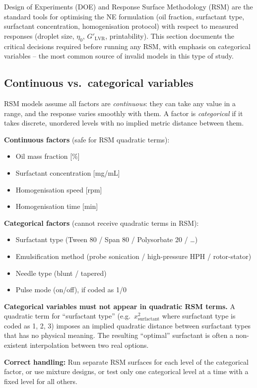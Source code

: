 \documentclass[11pt,a4paper]{article}
\begin{document}
Design of Experiments (DOE) and Response Surface Methodology (RSM)
are the standard tools for optimising the NE formulation (oil fraction,
surfactant type, surfactant concentration, homogenisation protocol)
with respect to measured responses (droplet size, $\eta_0$, $G'_\mathrm{LVR}$,
printability). This section documents the critical decisions required
before running any RSM, with emphasis on categorical variables -- the
most common source of invalid models in this type of study.

\subsection{Continuous vs.\ categorical variables}

RSM models assume all factors are \emph{continuous}: they can take any
value in a range, and the response varies smoothly with them. A factor
is \emph{categorical} if it takes discrete, unordered levels with no
implied metric distance between them.

\textbf{Continuous factors} (safe for RSM quadratic terms):
\begin{itemize}[leftmargin=1.4em,itemsep=1pt]
\item Oil mass fraction [\%]
\item Surfactant concentration [mg/mL]
\item Homogenisation speed [rpm]
\item Homogenisation time [min]
\end{itemize}

\textbf{Categorical factors} (cannot receive quadratic terms in RSM):
\begin{itemize}[leftmargin=1.4em,itemsep=1pt]
\item Surfactant type (Tween 80 / Span 80 / Polysorbate 20 / \ldots)
\item Emulsification method (probe sonication / high-pressure HPH /
  rotor-stator)
\item Needle type (blunt / tapered)
\item Pulse mode (on/off), if coded as 1/0
\end{itemize}

\begin{warningbox}
\textbf{Categorical variables must not appear in quadratic RSM terms.}
A quadratic term for ``surfactant type'' (e.g.\ $x_\mathrm{surfactant}^2$
where surfactant type is coded as 1, 2, 3) imposes an implied quadratic
distance between surfactant types that has no physical meaning. The
resulting ``optimal'' surfactant is often a non-existent interpolation
between two real options.

\medskip\textbf{Correct handling:} Run separate RSM surfaces for each
level of the categorical factor, or use mixture designs, or test only
one categorical level at a time with a fixed level for all others.
\end{warningbox}
\end{document}
